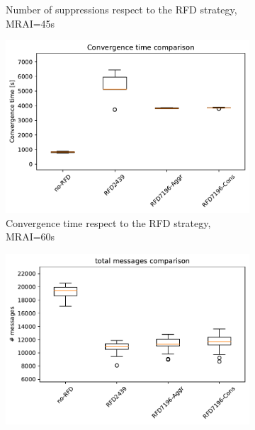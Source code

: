 \begin{figure}[H]
\begin{subfigure}[b]{0.325\textwidth}
         \caption{Number of suppressions respect to the RFD strategy, MRAI=45s}
         \label{fig:1000_RFD_MRAI30_suppressions_elephant}
     \end{subfigure}
     \vfill
     \begin{subfigure}[b]{0.325\textwidth}
         \centering
         \includegraphics[width=\textwidth]{images/RFD/miceVSelephants/MultiMRAI/60/elephants/cisco_1000MRAI60_rfd_comparison_time_boxplot.pdf}
         \caption{Convergence time respect to the RFD strategy, MRAI=60s}
         \label{fig:1000_RFD_MRAI30_time_elephant}
     \end{subfigure}
     \hfill
     \begin{subfigure}[b]{0.325\textwidth}
         \centering
         \includegraphics[width=\textwidth]{images/RFD/miceVSelephants/MultiMRAI/60/elephants/cisco_1000MRAI60_rfd_comparison_messages_boxplot.pdf}

\end{subfigure}
\end{figure}

